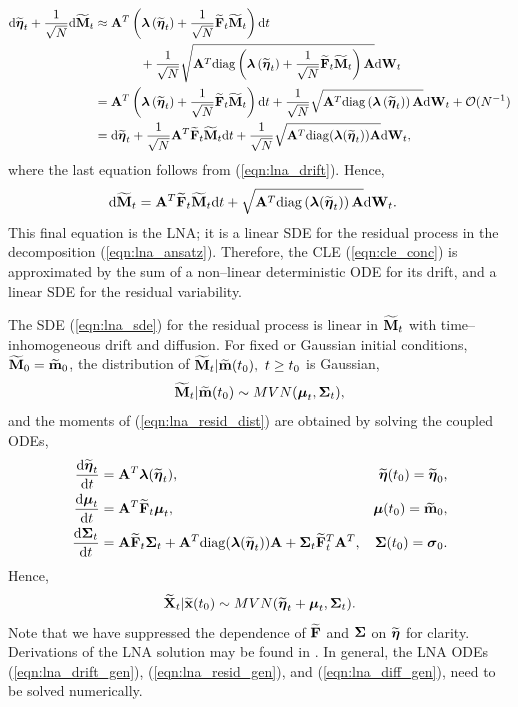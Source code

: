 \begin{align}
\mathrm{d}\widetilde{\boldsymbol{\eta}}_t + \frac{1}{\sqrt{N}}\mathrm{d}\widetilde{\mathbf{M}}_t &\approx \mathbf{A}^T\left (\boldsymbol{\lambda}\left (\widetilde{\boldsymbol{\eta}}_t\right ) + \frac{1}{\sqrt{N}}\widetilde{\mathbf{F}}_t\widetilde{\mathbf{M}}_t\right )\mathrm{d} t \nonumber \\
&\hspace{0.5in} +\frac{1}{\sqrt{N}}\sqrt{\mathbf{A}^T\mathrm{diag}\left (\boldsymbol{\lambda}\left (\widetilde{\boldsymbol{\eta}}_t\right ) + \frac{1}{\sqrt{N}}\widetilde{\mathbf{F}}_t\widetilde{\mathbf{M}}_t\right )\mathbf{A}}\mathrm{d}\mathbf{W}_t \nonumber \\
&= \mathbf{A}^T\left (\boldsymbol{\lambda}\left (\widetilde{\boldsymbol{\eta}}_t\right ) + \frac{1}{\sqrt{N}}\widetilde{\mathbf{F}}_t\widetilde{\mathbf{M}}_t\right )\mathrm{d} t + \frac{1}{\sqrt{N}}\sqrt{\mathbf{A}^T\mathrm{diag}\left (\boldsymbol{\lambda}\left (\widetilde{\boldsymbol{\eta}}_t\right )\right )\mathbf{A}}\mathrm{d}\mathbf{W}_t + \mathcal{O}(N^{-1}) \nonumber\\
&= \mathrm{d}\widetilde{\boldsymbol{\eta}}_t  + \frac{1}{\sqrt{N}}\mathbf{A}^T\widetilde{\mathbf{F}}_t\widetilde{\mathbf{M}}_t\mathrm{d} t + \frac{1}{\sqrt{N}}\sqrt{\mathbf{A}^T\mathrm{diag}(\boldsymbol{\lambda}(\widetilde{\boldsymbol{\eta}}_t))\mathbf{A}}\mathrm{d}\mathbf{W}_t,\nonumber
\end{align}
where the last equation follows from (\ref{eqn:lna_drift}). Hence,
\begin{align}
\label{eqn:lna_sde}
\rmd\bMtil_t &= \bA^T\bFtil_t\bMtil_t\dt + \sqrt{\bA^T\diag\left (\blambda(\boetatil_t)\right )\bA}\rmd\bW_t.
\end{align}
This final equation is the LNA; it is a linear SDE for the residual process in the decomposition (\ref{eqn:lna_ansatz}). Therefore, the CLE (\ref{eqn:cle_conc}) is approximated by the sum of a non--linear deterministic ODE for its drift, and a linear SDE for the residual variability. 

The SDE (\ref{eqn:lna_sde}) for the residual process is linear in $ \widetilde{\mathbf{M}}_t $ with time--inhomogeneous drift and diffusion. For fixed or Gaussian initial conditions, $ \widetilde{\mathbf{M}}_0 = \widetilde{\mathbf{m}}_0 $, the distribution of $ \widetilde{\mathbf{M}}_t|\widetilde{\mathbf{m}}(t_0),\ t\geq t_0 $ is Gaussian,
\begin{equation}
\label{eqn:lna_resid_dist}
\bMtil_t|\bmtil(t_0) \sim MVN(\bmu_t,\bSigma_t),
\end{equation}
and the moments of (\ref{eqn:lna_resid_dist}) are obtained by solving the coupled ODEs,
\begin{align}
\label{eqn:lna_drift_gen}
\deriv{\boetatil_t}{t} &= \bA^T\blambda(\boetatil_t), & \boetatil(t_0) = \boetatil_0,\\
\label{eqn:lna_resid_gen}
\deriv{\bmu_t}{t} &= \bA^T\bFtil_t\bmu_t, & \bmu(t_0) = \bmtil_0, \\
\label{eqn:lna_diff_gen}
\deriv{\bSigma_t}{t} &= \bA\bFtil_t\bSigma_t + \bA^T\diag(\blambda(\boetatil_t))\bA + \bSigma_t\bFtil_t^T\bA^T, & \bSigma(t_0) = \bsigma_0. 
\end{align}
Hence,
\begin{equation}
\widetilde{\mathbf{X}}_t|\widetilde{\mathbf{x}}(t_0) \sim MVN(\widetilde{\boldsymbol{\eta}}_t + \boldsymbol{\mu}_t,\boldsymbol{\Sigma}_t).
\end{equation}
Note that we have suppressed the dependence of $ \widetilde{\mathbf{F}} $ and $ \boldsymbol{\Sigma} $ on $ \widetilde{\boldsymbol{\eta}} $ for clarity. Derivations of the LNA solution may be found in \cite{vankampen2007stochastic,wallace2012linear,whitaker2016bayesian}. In general, the LNA ODEs (\ref{eqn:lna_drift_gen}), (\ref{eqn:lna_resid_gen}), and (\ref{eqn:lna_diff_gen}), need to be solved numerically. 

